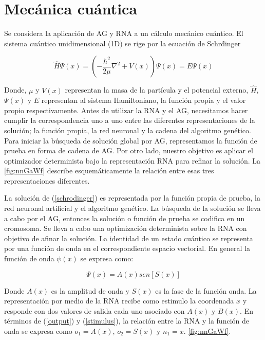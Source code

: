 \section{Mec\'anica cu\'antica}

Se considera la aplicaci\'on de AG y RNA a un c\'alculo mec\'anico
cu\'antico. El sistema cu\'antico unidimensional (1D) se rige por
la ecuaci\'on de Schr\"dinger

\begin{equation}
	\widehat{H}\Psi(x)=\left(-\frac{\hbar^2}{2\mu}\nabla^2+V(x)\right)\Psi(x)=E\Psi(x)
	\label{schrodinger}
\end{equation}

Donde, $\mu$ y $V(x)$ representan la masa de la part\'icula y el
potencial externo, $\widehat{H}$, $\Psi(x)$ y $E$ representan al sistema
Hamiltoniano, la funci\'on propia y el valor propio respectivamente.
Antes de utilizar la RNA y el AG, necesitamos hacer cumplir la correspondencia
uno a uno entre las diferentes representaciones de la soluci\'on; la funci\'on
propia, la red neuronal y la cadena del algoritmo gen\'etico. Para iniciar la b\'usqueda de soluci\'on
global por AG, representamos la funci\'on de prueba en forma de cadena de AG.
Por otro lado, nuestro objetivo es aplicar el optimizador determinista bajo
la representaci\'on RNA para refinar la soluci\'on. La \ref{fig:nnGaWf} describe
esquem\'aticamente la relaci\'on entre esas tres representaciones diferentes.

La soluci\'on de (\ref{schrodinger}) es representada por la funci\'on
propia de prueba, la red neuronal artificial y el algoritmo
gen\'etico. La b\'usqueda de la soluci\'on se lleva a cabo por el
AG, entonces la soluci\'on o funci\'on de prueba se codifica en
un cromosoma. Se lleva a cabo una optimizaci\'on determinista
sobre la RNA con objetivo de afinar la soluci\'on. La identidad
de un estado cu\'antico se representa por una funci\'on de onda
en el correspondiente espacio vectorial. En general la funci\'on
de onda $\psi(x)$ se expresa como: 

\begin{equation}
	\Psi(x)=A(x)sen[S(x)]\label{waveFunc}
\end{equation}

Donde $A(x)$ es la amplitud de onda y $S(x)$ es la fase de la
funci\'on onda. La representaci\'on por medio de la RNA recibe
como estimulo la coordenada $x$ y responde con dos valores
de salida cada uno asociado con $A(x)$ y $B(x)$. En t\'erminos
de (\ref{output}) y (\ref{stimulus}), la relaci\'on entre la RNA y la funci\'on de onda
se expresa como $o_1=A(x)$, $o_2=S(x)$ y $n_1=x$. \ref{fig:nnGaWf}.

